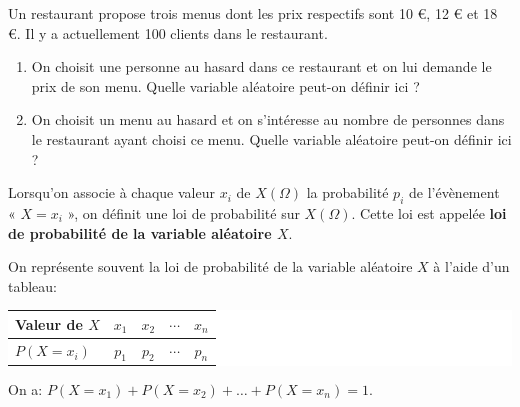 \documentclass[a4paper,11pt,cours]{nsi} %
\begin{document}
\begin{exercice}[ ]
	Un restaurant propose trois menus dont les prix respectifs sont 10 €, 12 € et 18 €. Il y a actuellement 100 clients dans le restaurant.
	\begin{enumerate}
		\item 	On choisit une personne au hasard dans ce restaurant et on lui demande le prix de son menu. Quelle variable aléatoire peut-on définir ici ?\\[0.5em]
		\item 	On choisit un menu au hasard et on s'intéresse au nombre de personnes dans le restaurant ayant choisi ce menu. Quelle variable aléatoire peut-on définir ici ?\\[0.5em]
	\end{enumerate}
\end{exercice}
\begin{definition}
	Lorsqu'on associe à chaque valeur $x_i$ de $X(\Omega)$ la probabilité $p_i$ de l'évènement « $X=x_i$ », on définit une loi de probabilité sur 
	$X(\Omega)$. Cette loi est appelée 
	\textbf{{\boldmath loi de probabilité de la variable aléatoire $X$}}.
\end{definition}

\begin{remarque}[]
	On représente souvent la loi de probabilité de la variable aléatoire $X$ à l'aide d'un tableau:
	\begin{center}
		\colorbox{white}{
			\begin{tabular}{|l|c|c|c|c|}
				\hline
				\textbf{{\boldmath Valeur de $X$}} & $x_1$ & $x_2$ & $\cdots$ & $x_n$\\
				\hline
				{\boldmath $P(X=x_i)$} & $p_1$ & $p_2$ & $\cdots$ & $p_n$\\
				\hline
		\end{tabular}}
	\end{center}
	On a: {\boldmath $P(X=x_1)+P(X=x_2)+ \ldots +P(X=x_n)=1$}.
\end{remarque}
\end{document}
